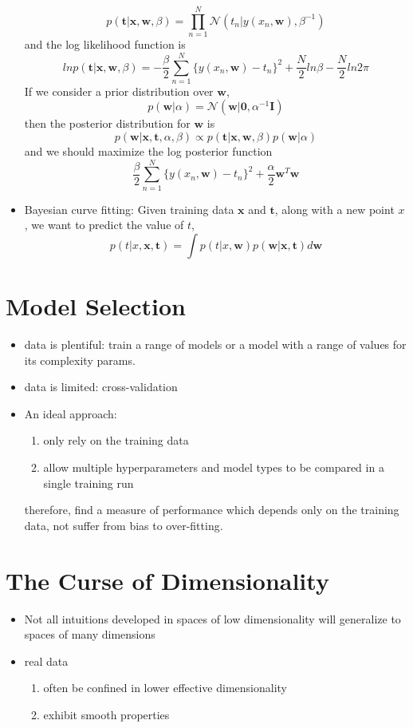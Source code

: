 \documentclass[12pt, a4paper]{article}
\begin{document}
\begin{itemize}
\[            p(\bm{t}|\bm{x},\bm{w},\beta)=\prod_{n=1}^N\mathcal{N}(t_n|y(x_n,\bm{w}),\beta^{-1})
            \]
        and the log likelihood function is 
        \[
            lnp(\bm{t}|\bm{x},\bm{w},\beta)=-\frac{\beta}{2}\sum_{n=1}^N\{y(x_n,\bm{w})-t_n\}^2
            +\frac{N}{2}ln\beta-\frac{N}{2}ln2\pi
            \]
        If we consider a prior distribution over $\bm{w}$,
        \[
            p(\bm{w}|\alpha)=\mathcal{N}(\bm{w}|\bm{0},\alpha^{-1}\bm{I})
            \]
        then the posterior distribution for $\bm{w}$ is 
        \[
            p(\bm{w}|\bm{x},\bm{t},\alpha,\beta)\propto p(\bm{t}|\bm{x},\bm{w},\beta)p(\bm{w}|\alpha)
            \]
        and we should maximize the log posterior function
        \[
            \frac{\beta}{2}\sum_{n=1}^N\{y(x_n,\bm{w})-t_n\}^2+\frac{\alpha}{2}\bm{w}^T\bm{w}
            \]
        \item Bayesian curve fitting: Given training data $\bm{x}$ and $\bm{t}$, along with a new
        point $x$, we want to predict the value of $t$, 
        \[
            p(t|x,\bm{x},\bm{t})=\int p(t|x,\bm{w})p(\bm{w}|\bm{x},\bm{t})d\bm{w}
            \]
    \end{itemize}
    \section{Model Selection}
    \begin{itemize}
        \item data is plentiful: train a range of models or a model with a range of values for its
        complexity params.
        \item  data is limited: cross-validation
        \item An ideal approach: 
        \begin{enumerate}
            \item only rely on the training data
            \item allow multiple hyperparameters and model types to be compared in a single 
            training run
        \end{enumerate}
        therefore, find a measure of performance which depends only on the training data, not
        suffer from bias to over-fitting.
    \end{itemize}
    \section{The Curse of Dimensionality}
    \begin{itemize}
        \item Not all intuitions developed in spaces of low dimensionality will generalize to 
        spaces of many dimensions
        \item real data 
        \begin{enumerate}
            \item often be confined in lower effective dimensionality
            \item exhibit smooth properties
        \end{enumerate}
    \end{itemize}
\end{document}
